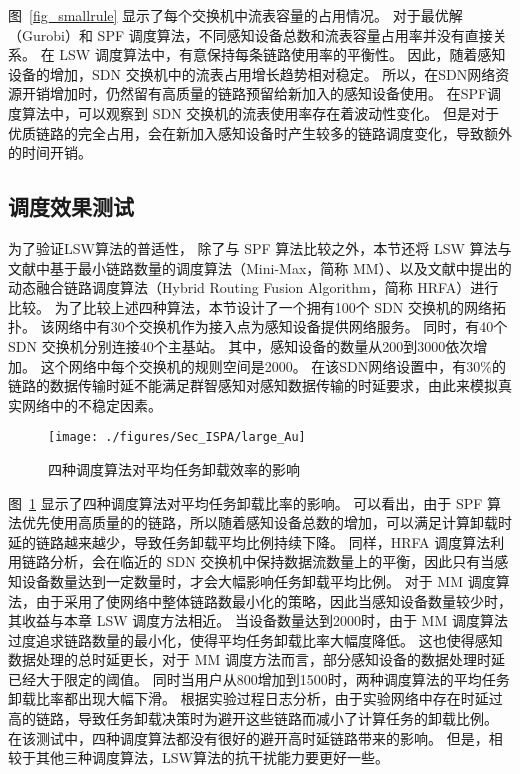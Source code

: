 图~\ref{fig_smallrule} 显示了每个交换机中流表容量的占用情况。
对于最优解（Gurobi）和 SPF 调度算法，不同感知设备总数和流表容量占用率并没有直接关系。
在 LSW 调度算法中，有意保持每条链路使用率的平衡性。
因此，随着感知设备的增加，SDN 交换机中的流表占用增长趋势相对稳定。
所以，在SDN网络资源开销增加时，仍然留有高质量的链路预留给新加入的感知设备使用。
在SPF调度算法中，可以观察到 SDN 交换机的流表使用率存在着波动性变化。
但是对于优质链路的完全占用，会在新加入感知设备时产生较多的链路调度变化，导致额外的时间开销。

\subsection{调度效果测试}

为了验证LSW算法的普适性，
除了与 SPF 算法比较之外，本节还将 LSW 算法与文献中基于最小链路数量的调度算法（Mini-Max，简称 MM）、以及文献中提出的动态融合链路调度算法（Hybrid Routing Fusion Algorithm，简称 HRFA）进行比较。
为了比较上述四种算法，本节设计了一个拥有100个 SDN 交换机的网络拓扑。
该网络中有30个交换机作为接入点为感知设备提供网络服务。
同时，有40个 SDN 交换机分别连接40个主基站。
其中，感知设备的数量从200到3000依次增加。
这个网络中每个交换机的规则空间是2000。
在该SDN网络设置中，有30\%的链路的数据传输时延不能满足群智感知对感知数据传输的时延要求，由此来模拟真实网络中的不稳定因素。

\begin{figure}[!h]
  \centering
  \texttt{[image: ./figures/Sec\_ISPA/large\_Au]}
  \vspace{-0.5em}
  \caption{四种调度算法对平均任务卸载效率的影响}
  \vspace{-1em}
  \label{fig_largeAu}
\end{figure}

图~\ref{fig_largeAu} 显示了四种调度算法对平均任务卸载比率的影响。
可以看出，由于 SPF 算法优先使用高质量的的链路，所以随着感知设备总数的增加，可以满足计算卸载时延的链路越来越少，导致任务卸载平均比例持续下降。
同样，HRFA 调度算法利用链路分析，会在临近的 SDN 交换机中保持数据流数量上的平衡，因此只有当感知设备数量达到一定数量时，才会大幅影响任务卸载平均比例。
对于 MM 调度算法，由于采用了使网络中整体链路数最小化的策略，因此当感知设备数量较少时，其收益与本章 LSW 调度方法相近。
当设备数量达到2000时，由于 MM 调度算法过度追求链路数量的最小化，使得平均任务卸载比率大幅度降低。
这也使得感知数据处理的总时延更长，对于 MM 调度方法而言，部分感知设备的数据处理时延已经大于限定的阈值。
同时当用户从800增加到1500时，两种调度算法的平均任务卸载比率都出现大幅下滑。
根据实验过程日志分析，由于实验网络中存在时延过高的链路，导致任务卸载决策时为避开这些链路而减小了计算任务的卸载比例。
在该测试中，四种调度算法都没有很好的避开高时延链路带来的影响。
但是，相较于其他三种调度算法，LSW算法的抗干扰能力要更好一些。

